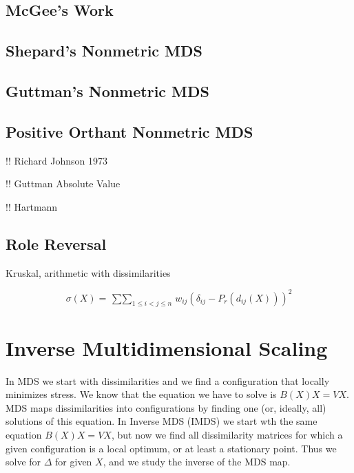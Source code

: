 \documentclass[
  12pt,
  letterpaper,
  DIV=11,
  numbers=noendperiod]{scrreprt}
\theoremstyle{remark}
\begin{document}
\section{McGee's Work}\label{mcgees-work}

\section{Shepard's Nonmetric MDS}\label{shepards-nonmetric-mds}

\section{Guttman's Nonmetric MDS}\label{guttmans-nonmetric-mds}

\section{Positive Orthant Nonmetric
MDS}\label{positive-orthant-nonmetric-mds}

!! Richard Johnson 1973

!! Guttman Absolute Value

!! Hartmann

\section{Role Reversal}\label{interrole}

Kruskal, arithmetic with dissimilarities

\[
\sigma(X)=\mathop{\sum\sum}_{1\leq i<j\leq n}w_{ij}(\delta_{ij}-P_r(d_{ij}(X)))^2
\]


\chapter{Inverse Multidimensional Scaling}\label{chinverse}

In MDS we start with dissimilarities and we find a configuration that
locally minimizes stress. We know that the equation we have to solve is
\(B(X)X=VX\). MDS maps dissimilarities into configurations by finding
one (or, ideally, all) solutions of this equation. In Inverse MDS (IMDS)
we start wth the same equation \(B(X)X=VX\), but now we find all
dissimilarity matrices for which a given configuration is a local
optimum, or at least a stationary point. Thus we solve for \(\Delta\)
for given \(X\), and we study the inverse of the MDS map.
\end{document}
